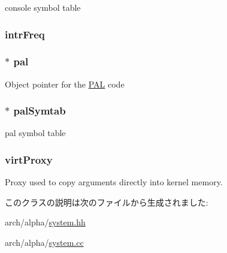 \label{classAlphaSystem_a112883d2eb9b5a5c79f3717e73a15dbb}
console symbol table \hypertarget{classAlphaSystem_a59830ff46622983eb3156d848aedd301}{
\subsubsection[{intrFreq}]{ {\bf intrFreq}}}
\label{classAlphaSystem_a59830ff46622983eb3156d848aedd301}
\hypertarget{classAlphaSystem_a12ab7425ba24138640ac20cb79fad014}{
\subsubsection[{pal}]{$\ast$ {\bf pal}}}
\label{classAlphaSystem_a12ab7425ba24138640ac20cb79fad014}
Object pointer for the \hyperlink{structPAL}{PAL} code \hypertarget{classAlphaSystem_a884de17d5e1c6df4f2784b07e868750e}{
\subsubsection[{palSymtab}]{$\ast$ {\bf palSymtab}}}
\label{classAlphaSystem_a884de17d5e1c6df4f2784b07e868750e}
pal symbol table \hypertarget{classAlphaSystem_a211e585d20649018ca8f1d7464b19db8}{
\subsubsection[{virtProxy}]{ {\bf virtProxy}}}
\label{classAlphaSystem_a211e585d20649018ca8f1d7464b19db8}
Proxy used to copy arguments directly into kernel memory. 

このクラスの説明は次のファイルから生成されました:\begin{DoxyCompactItemize}
\item 
arch/alpha/\hyperlink{arch_2alpha_2system_8hh}{system.hh}\item 
arch/alpha/\hyperlink{arch_2alpha_2system_8cc}{system.cc}\end{DoxyCompactItemize}
